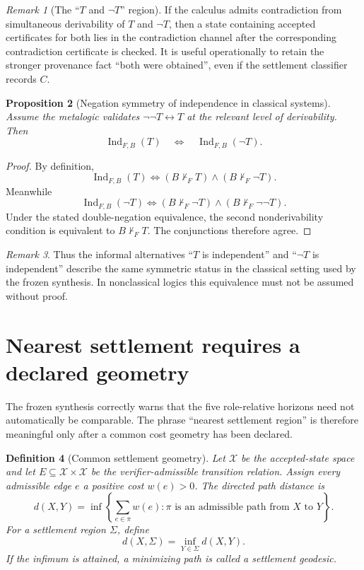 \documentclass[11pt]{article}
\newtheorem{definition}{Definition}[section]
\newtheorem{proposition}[definition]{Proposition}
\theoremstyle{remark}
\newtheorem{remark}[definition]{Remark}
\newcommand{\Ind}{\operatorname{Ind}}
\newcommand{\Sett}{\Sigma}
\begin{document}
\begin{remark}[The ``$T$ and $\neg T$'' region]
If the calculus admits contradiction from simultaneous derivability of $T$ and $\neg T$, then a state containing accepted certificates for both lies in the contradiction channel after the corresponding contradiction certificate is checked. It is useful operationally to retain the stronger provenance fact ``both were obtained'', even if the settlement classifier records $C$.
\end{remark}

\begin{proposition}[Negation symmetry of independence in classical systems]
Assume the metalogic validates $\neg\neg T\leftrightarrow T$ at the relevant level of derivability. Then
\[
\Ind_{F,B}(T)\quad\Longleftrightarrow\quad \Ind_{F,B}(\neg T).
\]
\end{proposition}
\begin{proof}
By definition,
\[
\Ind_{F,B}(T)\iff (B\nvdash_F T)\wedge(B\nvdash_F\neg T).
\]
Meanwhile
\[
\Ind_{F,B}(\neg T)\iff(B\nvdash_F\neg T)\wedge(B\nvdash_F\neg\neg T).
\]
Under the stated double-negation equivalence, the second nonderivability condition is equivalent to $B\nvdash_F T$. The conjunctions therefore agree.
\end{proof}

\begin{remark}
Thus the informal alternatives ``$T$ is independent'' and ``$\neg T$ is independent'' describe the same symmetric status in the classical setting used by the frozen synthesis. In nonclassical logics this equivalence must not be assumed without proof.
\end{remark}

\section{Nearest settlement requires a declared geometry}

The frozen synthesis correctly warns that the five role-relative horizons need not automatically be comparable. The phrase ``nearest settlement region'' is therefore meaningful only after a common cost geometry has been declared.

\begin{definition}[Common settlement geometry]
Let $\mathcal X$ be the accepted-state space and let $E\subseteq\mathcal X\times\mathcal X$ be the verifier-admissible transition relation. Assign every admissible edge $e$ a positive cost $w(e)>0$. The directed path distance is
\[
d(X,Y)=\inf\left\{\sum_{e\in\pi}w(e):\pi\text{ is an admissible path from }X\text{ to }Y\right\}.
\]
For a settlement region $\Sett$, define
\[
d(X,\Sett)=\inf_{Y\in\Sett}d(X,Y).
\]
If the infimum is attained, a minimizing path is called a settlement geodesic.
\end{definition}
\end{document}
